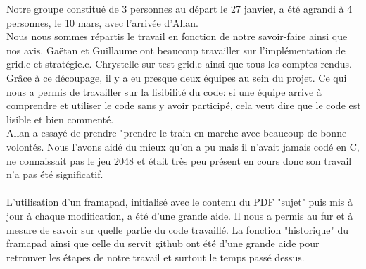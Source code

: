 \documentclass{report}
\begin{document}
Notre groupe constitué de 3 personnes au départ le 27 janvier, a été agrandi à 4 personnes, le 10 mars, avec l'arrivée d'Allan.\\ Nous nous sommes répartis le travail en fonction de notre savoir-faire ainsi que nos avis. Gaëtan et Guillaume ont beaucoup travailler sur l'implémentation de grid.c et stratégie.c. Chrystelle sur test-grid.c ainsi que tous les comptes rendus. Grâce à ce découpage, il y a eu presque deux équipes au sein du projet. Ce qui nous a permis de travailler sur la lisibilité du code: si une équipe arrive à comprendre et utiliser le code sans y avoir participé, cela veut dire que le code est lisible et bien commenté.\\ Allan a essayé de prendre "prendre le train en marche avec beaucoup de bonne volontés. Nous l'avons aidé du mieux qu'on a pu mais il n'avait jamais codé en C, ne connaissait pas le jeu 2048 et était très peu présent en cours donc son travail n'a pas été significatif. \\ \\ L'utilisation d'un framapad, initialisé avec le contenu du PDF "sujet" puis mis à jour à chaque modification, a été d'une grande aide. Il nous a permis au fur et à mesure de savoir sur quelle partie du code travaillé. La fonction "historique" du framapad ainsi que celle du servit github ont été d'une grande aide pour retrouver les étapes de notre travail et surtout le temps passé dessus.
\end{document}
